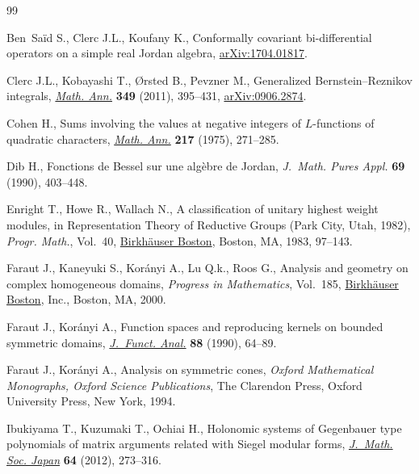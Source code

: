 \documentclass[pdftex]{sigma}
\numberwithin{equation}{section}
\begin{document}
\begin{thebibliography}{99}
\footnotesize\itemsep=0pt

Ben~Sa\"{i}d S., Clerc J.L., Koufany K., Conformally covariant bi-differential
 operators on a simple real {J}ordan algebra, \href{https://arxiv.org/abs/1704.01817}{arXiv:1704.01817}.

Clerc J.L., Kobayashi T., {\O}rsted B., Pevzner M., Generalized
 {B}ernstein--{R}eznikov integrals, \href{https://doi.org/10.1007/s00208-010-0516-4}{\textit{Math. Ann.}} \textbf{349} (2011),
 395--431, \href{https://arxiv.org/abs/0906.2874}{arXiv:0906.2874}.

Cohen H., Sums involving the values at negative integers of {$L$}-functions of
 quadratic characters, \href{https://doi.org/10.1007/BF01436180}{\textit{Math. Ann.}} \textbf{217} (1975), 271--285.

Dib H., Fonctions de {B}essel sur une alg\`ebre de {J}ordan, \textit{J.~Math.
 Pures Appl.} \textbf{69} (1990), 403--448.

Enright T., Howe R., Wallach N., A classification of unitary highest weight
 modules, in Representation Theory of Reductive Groups ({P}ark {C}ity, {U}tah,
 1982), \textit{Progr. Math.}, Vol.~40, \href{https://doi.org/10.1007/978-1-4684-6730-7_7}{Birkh\"{a}user Boston}, Boston, MA,
 1983, 97--143.

Faraut J., Kaneyuki S., Kor\'{a}nyi A., Lu Q.k., Roos G., Analysis and geometry
 on complex homogeneous domains, \textit{Progress in Mathematics}, Vol.~185,
 \href{https://doi.org/10.1007/978-1-4612-1366-6}{Birkh\"{a}user Boston}, Inc., Boston, MA, 2000.

Faraut J., Kor\'{a}nyi A., Function spaces and reproducing kernels on bounded
 symmetric domains, \href{https://doi.org/10.1016/0022-1236(90)90119-6}{\textit{J.~Funct. Anal.}} \textbf{88} (1990), 64--89.

Faraut J., Kor\'{a}nyi A., Analysis on symmetric cones, \textit{Oxford Mathematical
 Monographs, Oxford Science Publications}, The Clarendon Press, Oxford
 University Press, New York, 1994.

Ibukiyama T., Kuzumaki T., Ochiai H., Holonomic systems of {G}egenbauer type
 polynomials of matrix arguments related with {S}iegel modular forms,
 \href{https://doi.org/10.2969/jmsj/06410273}{\textit{J.~Math. Soc. Japan}} \textbf{64} (2012), 273--316.


\end{thebibliography}
\end{document}
